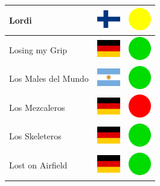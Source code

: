 \documentclass[12pt, a4paper, twoside]{report}
\begin{document}
\begin{center}
\begin{longtable}{|p{5cm}|p{2cm}|p{2cm}|}
 Lordi                                                      & \includegraphics[width=1cm]{../4x3/fi} &   \includegraphics[width=1cm]{../likes/m} \\ \hline
 Losing my Grip                                             & \includegraphics[width=1cm]{../4x3/de} &   \includegraphics[width=1cm]{../likes/y} \\ \hline
 Los Males del Mundo                                        & \includegraphics[width=1cm]{../4x3/ar} &   \includegraphics[width=1cm]{../likes/y} \\ \hline
 Los Mezcaleros                                             & \includegraphics[width=1cm]{../4x3/de} &   \includegraphics[width=1cm]{../likes/n} \\ \hline
 Los Skeleteros                                             & \includegraphics[width=1cm]{../4x3/de} &   \includegraphics[width=1cm]{../likes/y} \\ \hline
 Lost on Airfield                                           & \includegraphics[width=1cm]{../4x3/de} &   \includegraphics[width=1cm]{../likes/y} \\ \hline

\end{longtable}
\end{center}
\end{document}
